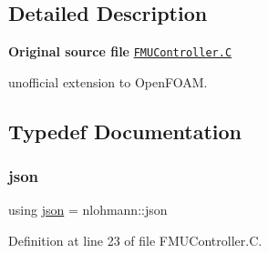\subsection{Detailed Description}
{\bfseries Original source file} \href{../../../home/carlo/data/GeN-Foam/GeN-Foam_ffn/GeN-Foam/GeN-Foam/FMU4FOAM/src/OF_FMU/FMU/FMUController.C}{\tt F\+M\+U\+Controller.\+C}

\begin{DoxyVerb}unofficial extension to OpenFOAM.\end{DoxyVerb}


\subsection{Typedef Documentation}
\mbox{\label{FMUController_8C_ab701e3ac61a85b337ec5c1abaad6742d}} 
\subsubsection{\texorpdfstring{json}{json}}
{\footnotesize\ttfamily using \hyperlink{dictModifier_8C_ab701e3ac61a85b337ec5c1abaad6742d}{json} =  nlohmann\+::json}



Definition at line 23 of file F\+M\+U\+Controller.\+C.

